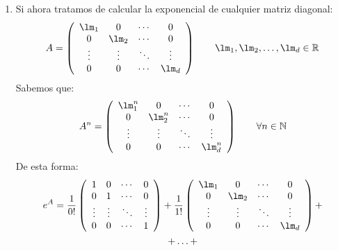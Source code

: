\begin{ejemplo}
\begin{enumerate}
        \item Si ahora tratamos de calcular la exponencial de cualquier matriz diagonal:
            \begin{equation*}
                A = \left(\begin{array}{cccc}
                        \lm_1 & 0 & \cdots & 0 \\
                        0 & \lm_2 & \cdots & 0 \\
                        \vdots & \vdots & \ddots & \vdots \\
                        0 & 0 & \cdots & \lm_d
                \end{array}\right) \qquad \lm_1,\lm_2,\ldots,\lm_d\in \mathbb{R}
            \end{equation*}
            Sabemos que:
            \begin{equation*}
                A^n = \left(\begin{array}{cccc}
                        \lm_1^n & 0 & \cdots & 0 \\
                        0 & \lm_2^n & \cdots & 0 \\
                        \vdots & \vdots & \ddots & \vdots \\
                        0 & 0 & \cdots & \lm_d^n
                \end{array}\right)  \qquad \forall n\in \mathbb{N}
            \end{equation*}
            De esta forma:
            \begin{multline*}
                e^A = \frac{1}{0!}\left(\begin{array}{cccc}
                        1 & 0 & \cdots & 0 \\
                        0 & 1 & \cdots & 0 \\
                        \vdots & \vdots & \ddots & \vdots \\
                        0 & 0 & \cdots & 1
                \end{array}\right) + 
                \frac{1}{1!}
                \left(\begin{array}{cccc}
                     \lm_1 & 0 & \cdots & 0 \\
                     0 & \lm_2 & \cdots & 0 \\
                    \vdots & \vdots & \ddots & \vdots \\
                     0 & 0  & \cdots & \lm_d
                \end{array}\right) + \\ + \ldots +

\end{multline*}
\end{enumerate}
\end{ejemplo}
